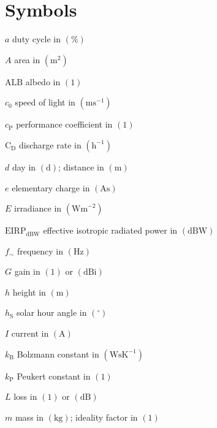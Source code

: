  
\chapter*{Symbols}
 
\begin{symb} %
\item[$a$]								duty cycle in $\left(\%\right)$
\item[$A$]								area in $\left(\mathrm{m}^2\right)$
\item[$\mathrm{ALB}$]					albedo in $\left(1\right)$
\item[$c_0$]							speed of light in $\left(\mathrm{ms}^{-1}\right)$
\item[$c_\mathrm{P}$]					performance coefficient in $\left(1\right)$
\item[$\mathrm{C_D}$]					discharge rate in $\left(\mathrm{h}^{-1}\right)$
\item[$d$]								day in $\left(\mathrm{d}\right)$; distance in $\left(\mathrm{m}\right)$
\item[$e$]								elementary charge in $\left(\mathrm{As}\right)$
\item[$E$]								irradiance in $\left(\mathrm{Wm}^{-2}\right)$
\item[$\mathrm{EIRP_{dBW}}$]					effective isotropic radiated power in $\left(\mathrm{dBW}\right)$
\item[$f_\sim$]							frequency in $\left(\mathrm{Hz}\right)$
\item[$G$]								gain in $\left(1\right)$ or $\left(\mathrm{dBi}\right)$
\item[$h$]								height in $\left(\mathrm{m}\right)$						
\item[$h_\mathrm{S}$]					solar hour angle in $\left(^\circ\right)$
\item[$I$]								current in $\left(\mathrm{A}\right)$
\item[$k_\mathrm{B}$]					Bolzmann constant in $\left(\mathrm{WsK}^{-1}\right)$
\item[$k_\mathrm{P}$]					Peukert constant in $\left(1\right)$
\item[$L$]								loss in $\left(1\right)$ or $\left(\mathrm{dB}\right)$
\item[$m$]								mass in $\left(\mathrm{kg}\right)$; ideality factor in $\left(1\right)$

\end{symb}
